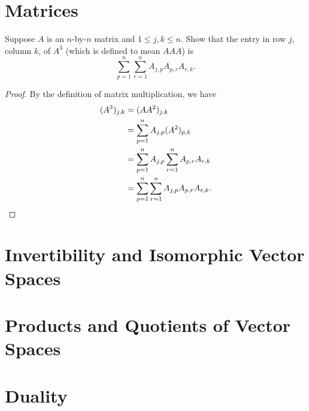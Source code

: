 \section{Matrices}

\begin{exercise}{15}
	Suppose \( A \) is an \( n \)-by-\( n \) matrix and \( 1 \le j, k \le n \). Show that the entry in row \( j \), column \( k \), of \( A^{3} \) (which is defined to mean \( AAA \)) is
	\[
		\sum_{p = 1}^{n} \sum_{r = 1}^{n} A_{j,p}A_{p,r}A_{r,k}.
	\]
\end{exercise}

\begin{proof}
	By the definition of matrix multiplication, we have
	\begin{align*}
		(A^{3})_{j,k} &= (AA^{2})_{j,k} \\
									&= \sum_{p = 1}^{n} A_{j,p}(A^{2})_{p,k} \\
									&= \sum_{p = 1}^{n} A_{j,p} \sum_{r = 1}^{n} A_{p,r}A_{r,k} \\
									&= \sum_{p = 1}^{n} \sum_{r = 1}^{n} A_{j,p}A_{p,r}A_{r,k}. \qedhere
	\end{align*}
\end{proof}

\section{Invertibility and Isomorphic Vector Spaces}

\section{Products and Quotients of Vector Spaces}

\section{Duality}
